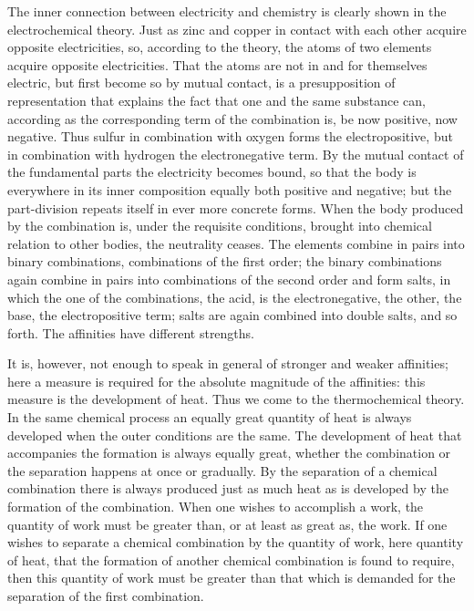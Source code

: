 \documentclass[12pt]{book}
\begin{document}
The inner connection between electricity and chemistry is clearly shown in the
electrochemical theory. Just as zinc and copper in contact with each other acquire
opposite electricities, so, according to the theory, the atoms of two elements
acquire opposite electricities. That the atoms are not in and for themselves electric,
but first become so by mutual contact, is a presupposition of representation that
explains the fact that one and the same substance can, according as the corresponding
term of the combination is, be now positive, now negative. Thus sulfur in combination
with oxygen forms the electropositive, but in combination with hydrogen the
electronegative term. By the mutual contact of the fundamental parts the electricity
becomes bound, so that the body is everywhere in its inner composition equally both
positive and negative; but the part-division repeats itself in ever more concrete
forms. When the body produced by the combination is, under the requisite conditions,
brought into chemical relation to other bodies, the neutrality ceases. The elements
combine in pairs into binary combinations, combinations of the first order; the binary
combinations again combine in pairs into combinations of the second order and form
salts, in which the one of the combinations, the acid, is the electronegative, the
other, the base, the electropositive term; salts are again combined into double salts,
and so forth. The affinities have different strengths.

It is, however, not enough to speak in general of stronger and weaker affinities; here
a measure is required for the absolute magnitude of the affinities: this measure is
the development of heat. Thus we come to the thermochemical theory. In the same
chemical process an equally great quantity of heat is always developed when the outer
conditions are the same. The development of heat that accompanies the formation is
always equally great, whether the combination or the separation happens at once or
gradually. By the separation of a chemical combination there is always produced just
as much heat as is developed by the formation of the combination. When one wishes to
accomplish a work, the quantity of work must be greater than, or at least as great as,
the work. If one wishes to separate a chemical combination by the quantity of work,
here quantity of heat, that the formation of another chemical combination is found to
require, then this quantity of work must be greater than that which is demanded for
the separation of the first combination.
\end{document}
